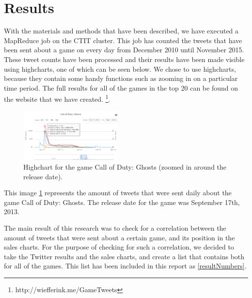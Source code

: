 \section{Results}
With the materials and methods that have been described, we have executed a MapReduce job on the CTIT cluster. This job has counted the tweets that have been sent about a game on every day from December 2010 until November 2015. These tweet counts have been processed and their results have been made visible using highcharts, one of which can be seen below. We chose to use highcharts, because they contain some handy functions such as zooming in on a particular time period. The full results for all of the games in the top 20 can be found on the website that we have created. \footnote{http://wiefferink.me/GameTweets}.

\begin{figure}[!ht]
	\centering
	\includegraphics[width=0.46\textwidth]{highchart-ghosts}
	\caption{Highchart for the game Call of Duty: Ghosts (zoomed in around the release date).}
	\label{highchartghosts}
\end{figure}

This image \ref{highchartghosts} represents the amount of tweets that were sent daily about the game Call of Duty: Ghosts.  The release date for the game was September 17th, 2013.

The main result of this research was to check for a correlation between the amount of tweets that were sent about a certain game, and its position in the sales charts. For the purpose of checking for such a correlation, we decided to take the Twitter results and the sales charts, and create a list that contains both for all of the games. This list has been included in this report as \ref{resultNumbers}.